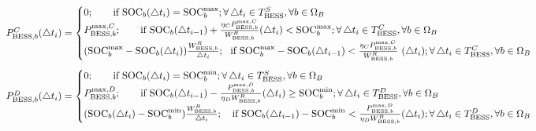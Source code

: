 \documentclass[journal]{IEEEtran}
\newcommand*\Laplace{\mathop{}\!\mathbin\bigtriangleup}
\begin{document}
\begin{figure*}
	    \begin{equation}
	    \scalebox{0.9}[0.9]{$
    P_{\text{BESS},b}^{C}(\Laplace {{t}_{i}})=
   \begin{cases}
    0;\qquad\text{if}\text{ }{\text{SO{C}}_{b}}(\Laplace {{t}_{i}})={\text{SOC}_{b}^{\max}};\forall \Laplace {{t}_{i}}\in T_{\text{BESS}}^{S},\forall b\in {{\Omega }_{B}} \\ 
    P_{\text{BESS},b}^{\max ,C};\qquad \text{if}~ {\text{SO{C}}_{b}}(\Laplace {{t}_{i-1}})+\frac{{{\eta }_{C}}P_{\text{BESS},b}^{\max ,C}}{W_{\text{BESS},b}^{R}}(\Laplace {{t}_{i}})<{\text{SOC}}_{b}^{\max};\forall \Laplace {{t}_{i}}\in T_{\text{BESS}}^{C},\forall b\in {{\Omega }_{B}} \\ 
    (\text{SOC}_{b}^{\max}-{\text{SO{C}}_{b}}(\Laplace {{t}_{i}}))\frac{W_{\text{BESS},b}^{R}}{\Laplace {{t}_{i}}}; ~~\text{if}~ {\text{SOC}_{b}^{\max}}-{\text{SO{C}}_{b}}(\Laplace {{t}_{i-1}})<\frac{{{\eta }_{C}}P_{\text{BESS},b}^{\max ,C}}{W_{\text{BESS},b}^{R}}\ (\Laplace {{t}_{i}});\forall \Laplace {{t}_{i}}\in T_{\text{BESS}}^{C},\forall b\in {{\Omega }_{B}}
\end{cases}
    $}
    \label{eqn17}
    \end{equation}
    \begin{equation}
    \scalebox{0.9}[0.9]{$
    P_{\text{BESS},b}^{D}(\Laplace {{t}_{i}})=
    \begin{cases}
    0;\qquad \text{if}~{\text{SO{C}}_{b}}(\Laplace {{t}_{i}})={\text{SOC}_{b}^{\min}};\forall \Laplace {{t}_{i}}\in T_{\text{BESS}}^{S},\forall b\in {{\Omega }_{B}} \\ 
    P_{\text{BESS},b}^{\max ,D};\qquad \text{if}~ {\text{SO{C}}_{b}}(\Laplace {{t}_{i-1}})-\frac{P_{\text{BESS},b}^{\max ,D}}{{{\eta }_{D}}W_{\text{BESS},b}^{R}}(\Laplace {{t}_{i}})\ge{\text{SOC}}_{b}^{\min };\forall \Laplace {{t}_{i}}\in T_{\text{BESS}}^{D},\forall b\in {{\Omega }_{B}} \\ 
    (\text{SO{C}}_{b}(\Laplace {{t}_{i}})-{\text{SOC}_{b}^{\min }})\frac{W_{\text{BESS},b}^{R}}{\Laplace {{t}_{i}}}; \text{ }~~ \text{if}~ {\text{SO{C}}_{b}}(\Laplace {{t}_{i-1}})-{\text{SOC}_{b}^{\min }}<\frac{P_{\text{BESS},b}^{\max ,D}}{{{\eta }_{D}}W_{\text{BESS},b}^{R}}(\Laplace {{t}_{i}});\forall \Laplace {{t}_{i}}\in T_{\text{BESS}}^{D},\forall b\in {{\Omega }_{B}} \\ 
\end{cases}
$}
    \label{eqn18}
    \end{equation}
\end{figure*}
\end{document}
